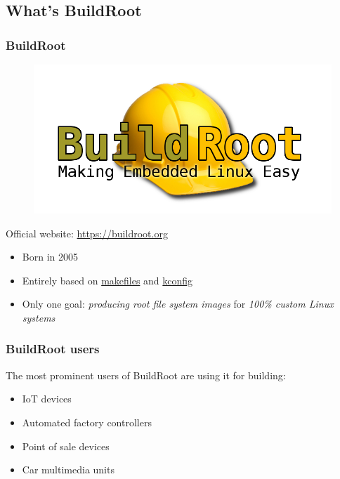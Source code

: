 \subsection{What's BuildRoot}
\begin{frame}
  \frametitle{BuildRoot}
  \begin{figure}
    \begin{center}
      \includegraphics[width=.5\textwidth]{logo-buildroot}
    \end{center}
  \end{figure}
  \begin{center}
    Official website: \url{https://buildroot.org}
  \end{center}
  \begin{itemize}
    \item Born in 2005
    \item Entirely based on \href{https://en.wikipedia.org/wiki/Make_(software)}{makefiles} and \href{https://www.kernel.org/doc/html/latest/kbuild/kconfig-language.html}{kconfig}
    \item Only one goal: \textit{producing root file system images} for \textit{100\% custom Linux systems}
  \end{itemize}
\end{frame}
\begin{frame}
  \frametitle{BuildRoot users}
  The most prominent users of BuildRoot are using it for building:
  \begin{itemize}
    \item IoT devices
    \item Automated factory controllers
    \item Point of sale devices
    \item Car multimedia units
  \end{itemize}
\end{frame}
